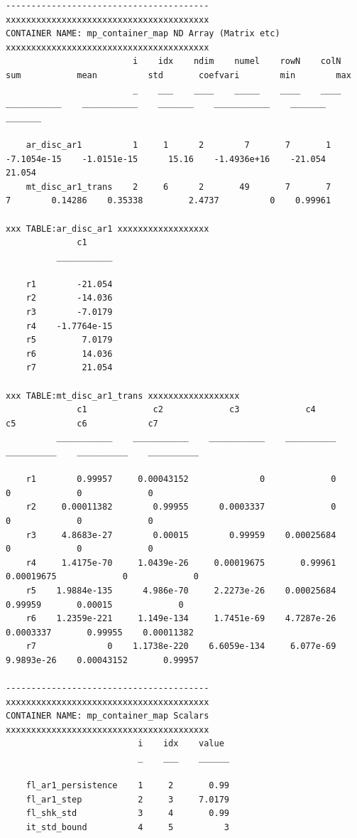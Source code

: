 \documentclass[
]{book}
\begin{document}
\begin{verbatim}
----------------------------------------
xxxxxxxxxxxxxxxxxxxxxxxxxxxxxxxxxxxxxxxx
CONTAINER NAME: mp_container_map ND Array (Matrix etc)
xxxxxxxxxxxxxxxxxxxxxxxxxxxxxxxxxxxxxxxx
                         i    idx    ndim    numel    rowN    colN        sum           mean          std       coefvari        min        max  
                         _    ___    ____    _____    ____    ____    ___________    ___________    _______    ___________    _______    _______

    ar_disc_ar1          1     1      2        7       7       1      -7.1054e-15    -1.0151e-15      15.16    -1.4936e+16    -21.054     21.054
    mt_disc_ar1_trans    2     6      2       49       7       7                7        0.14286    0.35338         2.4737          0    0.99961

xxx TABLE:ar_disc_ar1 xxxxxxxxxxxxxxxxxx
              c1     
          ___________

    r1        -21.054
    r2        -14.036
    r3        -7.0179
    r4    -1.7764e-15
    r5         7.0179
    r6         14.036
    r7         21.054

xxx TABLE:mt_disc_ar1_trans xxxxxxxxxxxxxxxxxx
              c1             c2             c3             c4            c5            c6            c7    
          ___________    ___________    ___________    __________    __________    __________    __________

    r1        0.99957     0.00043152              0             0             0             0             0
    r2     0.00011382        0.99955      0.0003337             0             0             0             0
    r3     4.8683e-27        0.00015        0.99959    0.00025684             0             0             0
    r4     1.4175e-70     1.0439e-26     0.00019675       0.99961    0.00019675             0             0
    r5    1.9884e-135      4.986e-70     2.2273e-26    0.00025684       0.99959       0.00015             0
    r6    1.2359e-221     1.149e-134     1.7451e-69    4.7287e-26     0.0003337       0.99955    0.00011382
    r7              0    1.1738e-220    6.6059e-134     6.077e-69    9.9893e-26    0.00043152       0.99957

----------------------------------------
xxxxxxxxxxxxxxxxxxxxxxxxxxxxxxxxxxxxxxxx
CONTAINER NAME: mp_container_map Scalars
xxxxxxxxxxxxxxxxxxxxxxxxxxxxxxxxxxxxxxxx
                          i    idx    value 
                          _    ___    ______

    fl_ar1_persistence    1     2       0.99
    fl_ar1_step           2     3     7.0179
    fl_shk_std            3     4       0.99
    it_std_bound          4     5          3


\end{verbatim}
\end{document}
